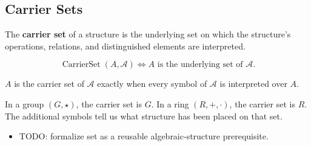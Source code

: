 \subsection*{Carrier Sets}
\label{subsec:carrier-sets}

\begin{definition}
\label{def:carrier-set}
The \textbf{carrier set} of a structure is the underlying set on which the
structure's operations, relations, and distinguished elements are interpreted.
\end{definition}

\begin{remark*}
\[
\operatorname{CarrierSet}(A,\mathcal{A})
\Longleftrightarrow
A \text{ is the underlying set of } \mathcal{A}.
\]
\end{remark*}

\begin{remark*}
$A$ is the carrier set of $\mathcal{A}$ exactly when every symbol of
$\mathcal{A}$ is interpreted over $A$.
\end{remark*}


\begin{remark*}[Interpretation]
In a group $(G,\star)$, the carrier set is $G$.  In a ring $(R,+,\cdot)$, the
carrier set is $R$.  The additional symbols tell us what structure has been
placed on that set.
\end{remark*}

\begin{dependencies}
\begin{itemize}
  \item TODO: formalize set as a reusable algebraic-structure prerequisite.
\end{itemize}
\end{dependencies}
